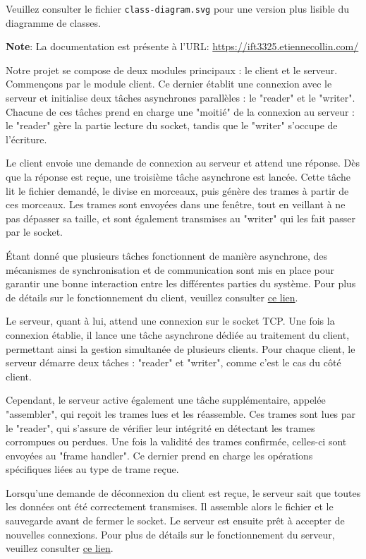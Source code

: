 \documentclass[french]{article}
\begin{document}
Veuillez consulter le fichier \texttt{class-diagram.svg} pour une version plus
lisible du diagramme de classes.

\textbf{Note}: La documentation est présente à l'URL: \href{https://ift3325.etiennecollin.com}{https://ift3325.etiennecollin.com/}

Notre projet se compose de deux modules principaux : le client et le serveur. Commençons par le module client. Ce dernier établit une connexion avec le serveur et initialise deux tâches asynchrones parallèles : le "reader" et le "writer". Chacune de ces tâches prend en charge une "moitié" de la connexion au serveur : le "reader" gère la partie lecture du socket, tandis que le "writer" s'occupe de l'écriture.

Le client envoie une demande de connexion au serveur et attend une réponse. Dès que la réponse est reçue, une troisième tâche asynchrone est lancée. Cette tâche lit le fichier demandé, le divise en morceaux, puis génère des trames à partir de ces morceaux. Les trames sont envoyées dans une fenêtre, tout en veillant à ne pas dépasser sa taille, et sont également transmises au "writer" qui les fait passer par le socket.

Étant donné que plusieurs tâches fonctionnent de manière asynchrone, des mécanismes de synchronisation et de communication sont mis en place pour garantir une bonne interaction entre les différentes parties du système. Pour plus de détails sur le fonctionnement du client, veuillez consulter \href{https://ift3325.etiennecollin.com/client/index.html}{ce lien}.

Le serveur, quant à lui, attend une connexion sur le socket TCP. Une fois la connexion établie, il lance une tâche asynchrone dédiée au traitement du client, permettant ainsi la gestion simultanée de plusieurs clients. Pour chaque client, le serveur démarre deux tâches : "reader" et "writer", comme c’est le cas du côté client.

Cependant, le serveur active également une tâche supplémentaire, appelée "assembler", qui reçoit les trames lues et les réassemble. Ces trames sont lues par le "reader", qui s'assure de vérifier leur intégrité en détectant les trames corrompues ou perdues. Une fois la validité des trames confirmée, celles-ci sont envoyées au "frame handler". Ce dernier prend en charge les opérations spécifiques liées au type de trame reçue.

Lorsqu'une demande de déconnexion du client est reçue, le serveur sait que toutes les données ont été correctement transmises. Il assemble alors le fichier et le sauvegarde avant de fermer le socket. Le serveur est ensuite prêt à accepter de nouvelles connexions. Pour plus de détails sur le fonctionnement du serveur, veuillez consulter \href{https://ift3325.etiennecollin.com/server/index.html}{ce lien}.
\end{document}
